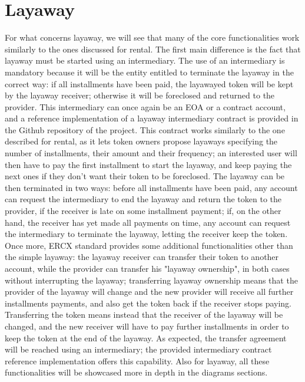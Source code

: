 \documentclass[english, LaM, oneside]{sapthesis}%
\begin{document}
\section{Layaway}
For what concerns layaway, we will see that many of the core functionalities work similarly to the ones discussed for rental. \newline
The first main difference is the fact that layaway must be started using an intermediary. The use of an intermediary is mandatory because it will be the entity entitled to terminate the layaway in the correct way: if all installments have been paid, the layawayed token will be kept by the layaway receiver; otherwise it will be foreclosed and returned to the provider. This intermediary can once again be an EOA or a contract account, and a reference implementation of a layaway intermediary contract is provided in the Github repository of the project. This contract works similarly to the one described for rental, as it lets token owners propose layaways specifying the number of installments, their amount and their frequency; an interested user will then have to pay the first installment to start the layaway, and keep paying the next ones if they don't want their token to be foreclosed. The layaway can be then terminated in two ways: before all installments have been paid, any account can request the intermediary to end the layaway and return the token to the provider, if the receiver is late on some installment payment; if, on the other hand, the receiver has yet made all payments on time, any account can request the intermediary to terminate the layaway, letting the receiver keep the token. \newline
Once more, ERCX standard provides some additional functionalities other than the simple layaway: the layaway receiver can transfer their token to another account, while the provider can transfer his "layaway ownership", in both cases without interrupting the layaway; transferring layaway ownership means that the provider of the layaway will change and the new provider will receive all further installments payments, and also get the token back if the receiver stops paying. Transferring the token means instead that the receiver of the layaway will be changed, and the new receiver will have to pay further installments in order to keep the token at the end of the layaway. As expected, the transfer agreement will be reached using an intermediary; the provided intermediary contract reference implementation offers this capability. \newline
Also for layaway, all these functionalities will be showcased more in depth in the diagrams sections.
\end{document}
